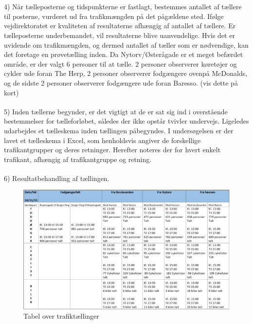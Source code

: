 ~\\\\
4) Når tælleposterne og tidspunkterne er fastlagt, bestemmes antallet af tællere til posterne, vurderet ud fra trafikmængden på det pågældene sted. Ifølge vejdirektoratet er kvaliteten af resultaterne afhængig af antallet af tællere. Er tælleposterne underbemandet, vil resultaterne blive uanvendelige. Hvis det er uvidende om trafikmængden, og dermed antallet af tæller som er nødvendige, kan det foretage en prøvetælling inden. Da Nytorv/Østerågade er et meget befærdet område, er der valgt 6 personer til at tælle. 2 personer observerer køretøjer og cykler ude foran The Herp, 2 personer observerer fodgængere ovenpå McDonalds, og de sidste 2 personer observerer fodgængere ude foran Baresso. (vis dette på kort)
~\\\\
5) Inden tællerne begynder, er det vigtigt at de er sat sig ind i overstående bestemmelser for tælleforløbet, således der ikke opstår tvivler undervejs. Ligeledes udarbejdes et tælleskema inden tællingen påbegyndes. I undersøgelsen er der lavet et tælleskema i Excel, som henholdsvis angiver de forskellige trafikantgrupper og deres retninger. Herefter noteres der for hvert enkelt trafikant, afhængig af trafikantgruppe og retning.
~\\\\
6) Resultatbehandling af tællingen.
\begin{figure}[htbp]
   \centering
   \begin{adjustbox}{max width=\textwidth}
     \includegraphics[scale=0.3]{figures/Billederogfigur/resultat.jpg}
  \end{adjustbox}
   \caption{Tabel over trafiktællinger}
   \label{fig:resultat}
 \end{figure}
